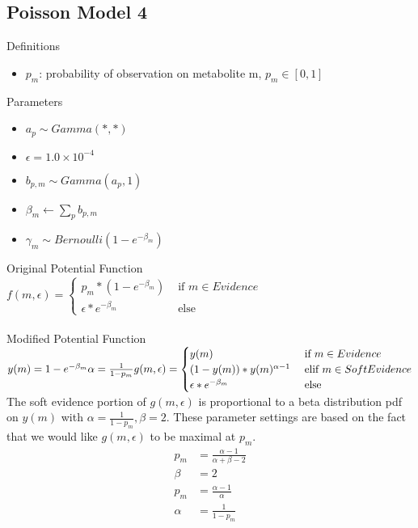 \documentclass[11pt]{article}
\begin{document}
\subsection {Poisson Model 4}
Definitions
\begin{itemize}
    \item $p_m$: probability of observation on metabolite m, $p_m \in [0,1]$
\end{itemize}
Parameters
\begin{itemize}
    \item $a_p \sim Gamma(*,*)$
    \item $\epsilon = 1.0\times10^{-4}$
    \item $b_{p,m} \sim Gamma(a_p, 1)$
    \item $\beta_m \leftarrow \sum_p b_{p,m}$
    \item $\gamma_m \sim Bernoulli(1 - e^{-\beta_m})$
\end{itemize}
Original Potential Function\\
$f(m,\epsilon) = \begin{cases}
 p_m * (1-e^{-\beta_m}) & \text{ if } m \in Evidence \\ 
 \epsilon * e ^ {-\beta_m}& \text{ else}
\end{cases}$
\\\\
Modified Potential Function \\
$y(m) = 1 - e^{-\beta_m} \\
\alpha = \frac{1}{1 - p_m}\\
g(m,\epsilon) = \begin{cases}
 y(m) & \text{ if } m \in Evidence \\ 
 (1 - y(m)) * y(m) ^ {\alpha - 1} &\text{ elif } m \in SoftEvidence\\
 \epsilon * e ^ {-\beta_m}& \text{ else}
\end{cases}$\\
The soft evidence portion of $g(m, \epsilon)$ is proportional to a beta distribution pdf on $y(m)$ with $\alpha = \frac{1}{1 - p_m}, \beta = 2$. These parameter settings are based on the fact that we would like $g(m, \epsilon)$ to be maximal at $p_m$. \\
$$\begin{align*}
p_m &= \frac{\alpha - 1}{\alpha + \beta - 2} \\ 
\beta &= 2 \\ 
p_m &= \frac{\alpha - 1}{\alpha} \\
\alpha &=  \frac{1}{1 - p_m}
\end{align*}$$
\end{document}
